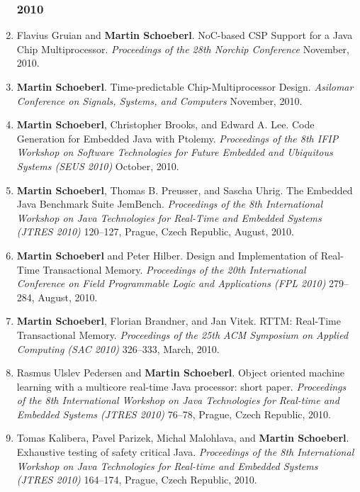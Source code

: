 \begin{enumerate}
\subsubsection*{2010}

\item Flavius Gruian and {\bf Martin Schoeberl}.
 NoC-based CSP Support for a Java Chip Multiprocessor.
 \emph{Proceedings of the 28th Norchip Conference} November, 2010.

\item {\bf Martin Schoeberl}.
 Time-predictable Chip-Multiprocessor Design.
 \emph{Asilomar Conference on Signals, Systems, and Computers} November, 2010.

\item {\bf Martin Schoeberl}, Christopher Brooks, and Edward A. Lee.
 Code Generation for Embedded Java with Ptolemy.
 \emph{Proceedings of the 8th IFIP Workshop on Software Technologies for Future Embedded and Ubiquitous Systems (SEUS 2010)} October, 2010.

\item {\bf Martin Schoeberl}, Thomas B. Preusser, and Sascha Uhrig.
 The Embedded Java Benchmark Suite JemBench.
 \emph{Proceedings of the 8th International Workshop on Java Technologies for Real-Time and Embedded Systems (JTRES 2010)} 120--127, Prague, Czech Republic, August, 2010.

\item {\bf Martin Schoeberl} and Peter Hilber.
 Design and Implementation of Real-Time Transactional Memory.
 \emph{Proceedings of the 20th International Conference on Field Programmable Logic and Applications (FPL 2010)} 279--284, August, 2010.

\item {\bf Martin Schoeberl}, Florian Brandner, and Jan Vitek.
 RTTM: Real-Time Transactional Memory.
 \emph{Proceedings of the 25th ACM Symposium on Applied Computing (SAC 2010)} 326--333, March, 2010.

\item Rasmus Ulslev Pedersen and {\bf Martin Schoeberl}.
 Object oriented machine learning with a multicore real-time Java processor: short paper.
 \emph{Proceedings of the 8th International Workshop on Java Technologies for Real-time and Embedded Systems (JTRES 2010)} 76--78, Prague, Czech Republic, 2010.

\item Tomas Kalibera, Pavel Parizek, Michal Malohlava, and {\bf Martin Schoeberl}.
 Exhaustive testing of safety critical Java.
 \emph{Proceedings of the 8th International Workshop on Java Technologies for Real-time and Embedded Systems (JTRES 2010)} 164--174, Prague, Czech Republic, 2010.


\end{enumerate}

